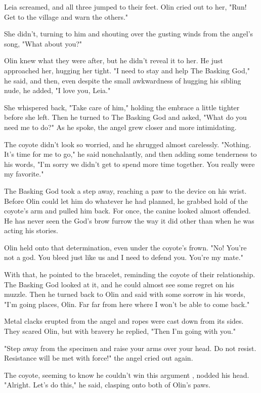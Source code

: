 Leia screamed, and all three jumped to their feet. Olin cried out to her, "Run! Get to the village and warn the others."

She didn't, turning to him and shouting over the gusting winds from the angel's song, "What about you?"

Olin knew what they were after, but he didn't reveal it to her. He just approached her, hugging her tight. "I need to stay and help The Basking God," he said, and then, even despite the small awkwardness of hugging his sibling nude, he added, "I love you, Leia."

She whispered back, "Take care of him," holding the embrace a little tighter before she left. Then he turned to The Basking God and asked, "What do you need me to do?" As he spoke, the angel grew closer and more intimidating.

The coyote didn't look so worried, and he shrugged almost carelessly. "Nothing. It's time for me to go," he said nonchalantly, and then adding some tenderness to his words, "I'm sorry we didn't get to spend more time together. You really were my favorite."

The Basking God took a step away, reaching a paw to the device on his wrist. Before Olin could let him do whatever he had planned, he grabbed hold of the coyote's arm and pulled him back. For once, the canine looked almost offended. He has never seen the God's brow furrow the way it did other than when he was acting his stories.

Olin held onto that determination, even under the coyote's frown. "No! You're not a god. You bleed just like us and I need to defend you. You're my mate."

With that, he pointed to the bracelet, reminding the coyote of their relationship. The Basking God looked at it, and he could almost see some regret on his muzzle. Then he turned back to Olin and said with some sorrow in his words, "I'm going places, Olin. Far far from here where I won't be able to come back."

Metal clacks erupted from the angel and ropes were cast down from its sides. They scared Olin, but with bravery he replied, "Then I'm going with you."

"Step away from the specimen and raise your arms over your head. Do not resist. Resistance will be met with force!" the angel cried out again.

The coyote, seeming to know he couldn't win this argument , nodded his head. "Alright. Let's do this," he said, clasping onto both of Olin's paws.

